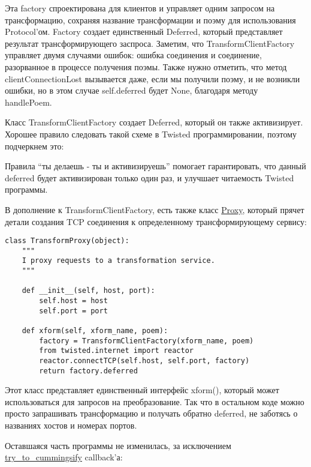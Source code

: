Эта factory спроектирована для клиентов и управляет 
одним запросом на трансформацию, сохраняя название 
трансформации и поэму для использования Protocol'ом. 
Factory создает единственный Deferred, 
который представляет результат трансформирующего заспроса. 
Заметим, что TransformClientFactory управляет двумя случаями ошибок: 
ошибка соединения и соединение, разорванное в процессе 
получения поэмы. Также нужно отметить, что метод clientConnectionLost 
вызывается даже, если мы получили поэму, и не возникли ошибки, 
но в этом случае self.deferred будет None, благодаря методу handlePoem.


Класс TransformClientFactory создает Deferred, который он также 
активизирует. Хорошее правило следовать такой схеме в 
Twisted программировании, поэтому подчеркнем это:




Правила ``ты делаешь - ты и активизируешь'' помогает гарантировать, 
что данный deferred будет активизирован только один раз, и 
улучшает читаемость Twisted программы.


В дополнение к TransformClientFactory, есть также класс 
\href{http://github.com/jdavisp3/twisted-intro/blob/master/twisted-client-6/get-poetry.py#L122}{Proxy}, 
который прячет детали создания TCP соединения к определенному 
трансформирующему сервису:

 \begin{verbatim}
class TransformProxy(object):
    """
    I proxy requests to a transformation service.
    """

    def __init__(self, host, port):
        self.host = host
        self.port = port

    def xform(self, xform_name, poem):
        factory = TransformClientFactory(xform_name, poem)
        from twisted.internet import reactor
        reactor.connectTCP(self.host, self.port, factory)
        return factory.deferred
\end{verbatim} 


Этот класс представляет единственный интерфейс xform(), 
который может использоваться для запросов на преобразование. 
Так что в остальном коде можно просто запрашивать трансформацию и 
получать обратно deferred, не заботясь о названиях хостов и 
номерах портов. 


Оставшаяся часть программы не изменилась, за исключением 
\href{http://github.com/jdavisp3/twisted-intro/blob/master/twisted-client-6/get-poetry.py#L163}{try\_to\_cummingsify} callback'а:

